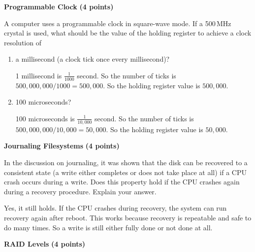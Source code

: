 \documentclass[10pt,answers]{exam}
\newcommand{\qpoints}[1]{\hfill \textbf{(#1 points)}}
\begin{document}
\begin{questions}
\question \textbf{Programmable Clock} \qpoints{4}

A computer uses a programmable clock in square-wave mode. If a 500\,MHz crystal is used, what should be the value of the holding register to achieve a clock resolution of

\begin{enumerate}[label=(\alph*)]
 \item a millisecond (a clock tick once every millisecond)?
 \begin{solution}
 1 millisecond is $\frac{1}{1000}$ second.
 So the number of ticks is $500{,}000{,}000 / 1000 = 500{,}000$.
 So the holding register value is $500{,}000$.
 \end{solution}

 \item 100 microseconds?
 \begin{solution}
 100 microseconds is $\frac{1}{10{,}000}$ second.
 So the number of ticks is $500{,}000{,}000 / 10{,}000 = 50{,}000$.
 So the holding register value is $50{,}000$.
 \end{solution}
\end{enumerate}


\question \textbf{Journaling Filesystems} \qpoints{4}

In the discussion on journaling, it was shown that the disk can be recovered to a consistent state (a write either completes or does not take place at all) if a CPU crash occurs during a write. Does this property hold if the CPU crashes again during a recovery procedure. Explain your answer.

\begin{solution}
Yes, it still holds.
If the CPU crashes during recovery, the system can run recovery again after reboot.
This works because recovery is repeatable and safe to do many times.
So a write is still either fully done or not done at all.
\end{solution}


\question \textbf{RAID Levels} \qpoints{4}


\end{questions}
\end{document}
